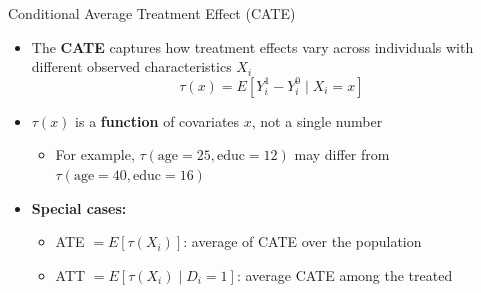\documentclass[hyperref={pdfpagelabels=false}]{beamer}
\begin{document}
\begin{frame}{Conditional Average Treatment Effect (CATE)}
	\begin{itemize}
		\item The \textbf{CATE} captures how treatment effects vary across individuals with different observed characteristics $X_i$
		\begin{equation*}
			\tau(x) = E[Y^{1}_{i} - Y^{0}_{i} \mid X_{i} = x]
		\end{equation*}
		\vspace{0.2cm}
		\item $\tau(x)$ is a \textbf{function} of covariates $x$, not a single number
		\vspace{0.2cm}
		\begin{itemize}
			\item For example, $\tau(\text{age}=25, \text{educ}=12)$ may differ from $\tau(\text{age}=40, \text{educ}=16)$
		\end{itemize}
		\vspace{0.3cm}
		\item \textbf{Special cases:}
		\vspace{0.2cm}
		\begin{itemize}
			\item ATE $= E[\tau(X_i)]$: average of CATE over the population
			\vspace{0.2cm}
			\item ATT $= E[\tau(X_i) \mid D_i = 1]$: average CATE among the treated
		\end{itemize}
	\end{itemize}
\end{frame}
\end{document}
